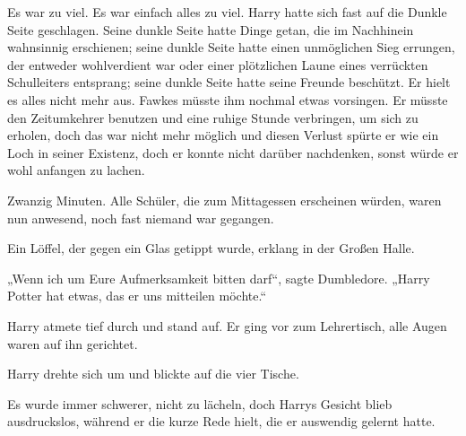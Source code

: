 Es war zu viel. Es war einfach alles zu viel. Harry hatte sich fast auf die Dunkle Seite geschlagen. Seine dunkle Seite hatte Dinge getan, die im Nachhinein wahnsinnig erschienen; seine dunkle Seite hatte einen unmöglichen Sieg errungen, der entweder wohlverdient war oder einer plötzlichen Laune eines verrückten Schulleiters entsprang; seine dunkle Seite hatte seine Freunde beschützt. Er hielt es alles nicht mehr aus. Fawkes müsste ihm nochmal etwas vorsingen. Er müsste den Zeitumkehrer benutzen und eine ruhige Stunde verbringen, um sich zu erholen, doch das war nicht mehr möglich und diesen Verlust spürte er wie ein Loch in seiner Existenz, doch er konnte nicht darüber nachdenken, sonst würde er wohl anfangen zu lachen. 

Zwanzig Minuten. Alle Schüler, die zum Mittagessen erscheinen würden, waren nun anwesend, noch fast niemand war gegangen. 

Ein Löffel, der gegen ein Glas getippt wurde, erklang in der Großen Halle. 

„Wenn ich um Eure Aufmerksamkeit bitten darf“, sagte Dumbledore. „Harry Potter hat etwas, das er uns mitteilen möchte.“ 

Harry atmete tief durch und stand auf. Er ging vor zum Lehrertisch, alle Augen waren auf ihn gerichtet. 

Harry drehte sich um und blickte auf die vier Tische. 

Es wurde immer schwerer, nicht zu lächeln, doch Harrys Gesicht blieb ausdruckslos, während er die kurze Rede hielt, die er auswendig gelernt hatte. 

